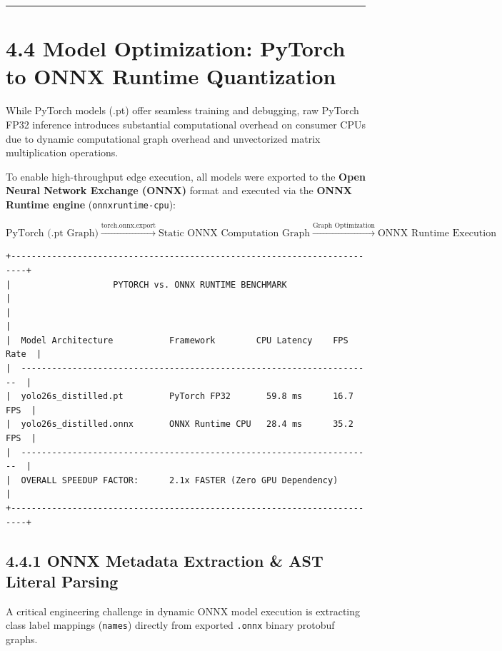 \begin{center}\rule{0.5\linewidth}{0.5pt}\end{center}

\section{4.4 Model Optimization: PyTorch to ONNX Runtime
Quantization}\label{model-optimization-pytorch-to-onnx-runtime-quantization}

While PyTorch models (.pt) offer seamless training and debugging, raw
PyTorch FP32 inference introduces substantial computational overhead on
consumer CPUs due to dynamic computational graph overhead and
unvectorized matrix multiplication operations.

To enable high-throughput edge execution, all models were exported to
the \textbf{Open Neural Network Exchange (ONNX)} format and executed via
the \textbf{ONNX Runtime engine} (\texttt{onnxruntime-cpu}):

\[\text{PyTorch (.pt Graph)} \xrightarrow{\text{torch.onnx.export}} \text{Static ONNX Computation Graph} \xrightarrow{\text{Graph Optimization}} \text{ONNX Runtime Execution}\]

\begin{verbatim}
+-------------------------------------------------------------------------+
|                    PYTORCH vs. ONNX RUNTIME BENCHMARK                   |
|                                                                         |
|  Model Architecture           Framework        CPU Latency    FPS Rate  |
|  ---------------------------------------------------------------------  |
|  yolo26s_distilled.pt         PyTorch FP32       59.8 ms      16.7 FPS  |
|  yolo26s_distilled.onnx       ONNX Runtime CPU   28.4 ms      35.2 FPS  |
|  ---------------------------------------------------------------------  |
|  OVERALL SPEEDUP FACTOR:      2.1x FASTER (Zero GPU Dependency)         |
+-------------------------------------------------------------------------+
\end{verbatim}

\subsection{4.4.1 ONNX Metadata Extraction \& AST Literal
Parsing}\label{onnx-metadata-extraction-ast-literal-parsing}

A critical engineering challenge in dynamic ONNX model execution is
extracting class label mappings (\texttt{names}) directly from exported
\texttt{.onnx} binary protobuf graphs.

